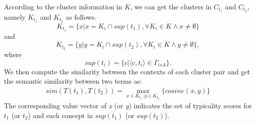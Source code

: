 According to the cluster information in $K$, we can get the clusters in $C_{t_1}$ and $C_{t_2}$, namely $K_{t_1}$ and $K_{t_2}$ as follows.
\[K_{t_1} = \{ x | x = K_i \cap sup(t_1),
\forall K_i \in K \land x \ne \emptyset\}\]
and
\[K_{t_2} = \{ y| y = K_i \cap sup(t_2),
\forall K_i \in K \land y \ne \emptyset\},\]
where \[sup(t_i) = \{c | \langle c, t_i \rangle \in \Gamma_{isA}\}.\]
We then compute the similarity between the contexts of each cluster pair
and get the semantic similarity between two terms as:
\begin{equation}
\begin{aligned}
sim(T(t_{1}), T(t_{2})) = \max_{x \in K_{t_1}, y \in K_{t_2}}\{cosine(x, y)\}
\label{eq:clusterCosine}
\end{aligned}
\end{equation}
The corresponding value vector of \emph{x} (or \emph{y}) indicates the set of typicality scores for $t_1$ (or $t_2$) and each concept in $sup(t_1)$ (or $sup(t_2)$).

